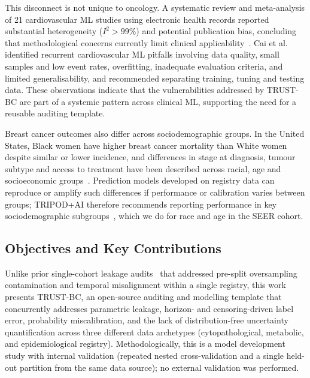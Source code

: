 \documentclass[11pt,a4paper]{article}
\begin{document}
This disconnect is not unique to oncology. A systematic review and meta-analysis of 21 cardiovascular ML studies using electronic health records reported substantial heterogeneity ($I^2>99\%$) and potential publication bias, concluding that methodological concerns currently limit clinical applicability~\cite{liu2025}. Cai et al.~\cite{cai2024} identified recurrent cardiovascular ML pitfalls involving data quality, small samples and low event rates, overfitting, inadequate evaluation criteria, and limited generalisability, and recommended separating training, tuning and testing data. These observations indicate that the vulnerabilities addressed by TRUST-BC are part of a systemic pattern across clinical ML, supporting the need for a reusable auditing template.

Breast cancer outcomes also differ across sociodemographic groups. In the United States, Black women have higher breast cancer mortality than White women despite similar or lower incidence, and differences in stage at diagnosis, tumour subtype and access to treatment have been described across racial, age and socioeconomic groups~\cite{acs2024}. Prediction models developed on registry data can reproduce or amplify such differences if performance or calibration varies between groups; TRIPOD+AI therefore recommends reporting performance in key sociodemographic subgroups~\cite{collins2024tripod}, which we do for race and age in the SEER cohort.

\subsection{Objectives and Key Contributions}\label{sec:objectives-and-key-contributio}
Unlike prior single-cohort leakage audits~\cite{tadj2026} that addressed pre-split oversampling contamination and temporal misalignment within a single registry, this work presents TRUST-BC, an open-source auditing and modelling template that concurrently addresses parametric leakage, horizon- and censoring-driven label error, probability miscalibration, and the lack of distribution-free uncertainty quantification across three different data archetypes (cytopathological, metabolic, and epidemiological registry). Methodologically, this is a model development study with internal validation (repeated nested cross-validation and a single held-out partition from the same data source); no external validation was performed.
\end{document}
